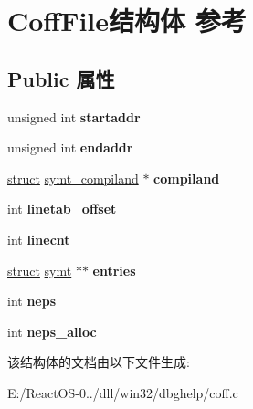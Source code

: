 \hypertarget{struct_coff_file}{}\section{Coff\+File结构体 参考}
\label{struct_coff_file}
\subsection*{Public 属性}
\begin{DoxyCompactItemize}
\item 
\mbox{\label{struct_coff_file_a64f269b76f243237759b1e7ebf8a606e}} 
unsigned int {\bfseries startaddr}
\item 
\mbox{\label{struct_coff_file_aea52c5cbec791619461f6af18b3e4e0a}} 
unsigned int {\bfseries endaddr}
\item 
\mbox{\label{struct_coff_file_a5c680c549763243852e3233a9a385523}} 
\hyperlink{interfacestruct}{struct} \hyperlink{structsymt__compiland}{symt\+\_\+compiland} $\ast$ {\bfseries compiland}
\item 
\mbox{\label{struct_coff_file_ac570a6ecb9302c9b3392900e63f97559}} 
int {\bfseries linetab\+\_\+offset}
\item 
\mbox{\label{struct_coff_file_a6e780ee88106771b68e8278544334e9c}} 
int {\bfseries linecnt}
\item 
\mbox{\label{struct_coff_file_a733f5a2e65be4ff2364181cbf753c1c2}} 
\hyperlink{interfacestruct}{struct} \hyperlink{structsymt}{symt} $\ast$$\ast$ {\bfseries entries}
\item 
\mbox{\label{struct_coff_file_ac4f4e30111a048f6ec55b7b2aac03fd0}} 
int {\bfseries neps}
\item 
\mbox{\label{struct_coff_file_a7fe4459099af9c00c754c0a7ae6b65b3}} 
int {\bfseries neps\+\_\+alloc}
\end{DoxyCompactItemize}


该结构体的文档由以下文件生成\+:\begin{DoxyCompactItemize}
\item 
E\+:/\+React\+O\+S-\/0../dll/win32/dbghelp/coff.\+c\end{DoxyCompactItemize}
